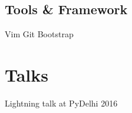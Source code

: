 \documentclass[]{deedy-resume-openfont}
\begin{document}
\begin{minipage}[t]{0.33\textwidth}
\subsection{Tools \& Framework}
\textbullet Vim \textbullet{} Git \textbullet{} Bootstrap
\sectionsep


\section{Talks}
\textbullet{} Lightning talk at PyDelhi 2016 \\
\sectionsep

%
%

\end{minipage}
\hfill
\end{document}
